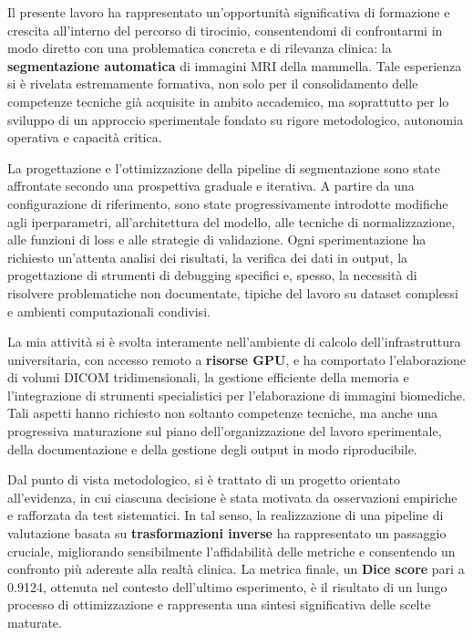 Il presente lavoro ha rappresentato un'opportunità significativa di formazione e crescita all’interno del percorso di tirocinio, consentendomi di confrontarmi in modo diretto con una problematica concreta e di rilevanza clinica: la \textbf{segmentazione automatica} di immagini MRI della mammella. Tale esperienza si è rivelata estremamente formativa, non solo per il consolidamento delle competenze tecniche già acquisite in ambito accademico, ma soprattutto per lo sviluppo di un approccio sperimentale fondato su rigore metodologico, autonomia operativa e capacità critica.

La progettazione e l’ottimizzazione della pipeline di segmentazione sono state affrontate secondo una prospettiva graduale e iterativa. A partire da una configurazione di riferimento, sono state progressivamente introdotte modifiche agli iperparametri, all’architettura del modello, alle tecniche di normalizzazione, alle funzioni di loss e alle strategie di validazione. Ogni sperimentazione ha richiesto un’attenta analisi dei risultati, la verifica dei dati in output, la progettazione di strumenti di debugging specifici e, spesso, la necessità di risolvere problematiche non documentate, tipiche del lavoro su dataset complessi e ambienti computazionali condivisi.

La mia attività si è svolta interamente nell’ambiente di calcolo dell’infrastruttura universitaria, con accesso remoto a \textbf{risorse GPU}, e ha comportato l’elaborazione di volumi DICOM tridimensionali, la gestione efficiente della memoria e l’integrazione di strumenti specialistici per l’elaborazione di immagini biomediche. Tali aspetti hanno richiesto non soltanto competenze tecniche, ma anche una progressiva maturazione sul piano dell’organizzazione del lavoro sperimentale, della documentazione e della gestione degli output in modo riproducibile.

Dal punto di vista metodologico, si è trattato di un progetto orientato all’evidenza, in cui ciascuna decisione è stata motivata da osservazioni empiriche e rafforzata da test sistematici. In tal senso, la realizzazione di una pipeline di valutazione basata su \textbf{trasformazioni inverse} ha rappresentato un passaggio cruciale, migliorando sensibilmente l’affidabilità delle metriche e consentendo un confronto più aderente alla realtà clinica. La metrica finale, un \textbf{Dice score} pari a 0.9124, ottenuta nel contesto dell’ultimo esperimento, è il risultato di un lungo processo di ottimizzazione e rappresenta una sintesi significativa delle scelte maturate.

